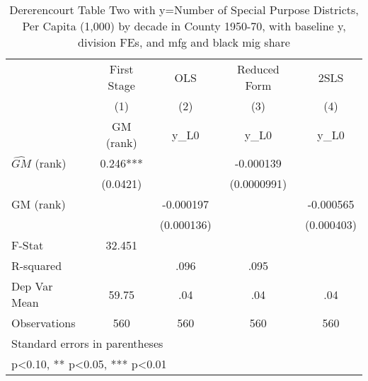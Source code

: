 \begin{table}[htbp]\centering
\def\sym#1{\ifmmode^{#1}\else\(^{#1}\)\fi}
\caption{Dererencourt Table Two with y=Number of Special Purpose Districts, Per Capita (1,000) by decade in County 1950-70, with baseline y, division FEs, and mfg and black mig share}
\begin{tabular}{l*{4}{c}}
\toprule
                    & First Stage   &         OLS   &Reduced Form   &        2SLS   \\
                    &\multicolumn{1}{c}{(1)}&\multicolumn{1}{c}{(2)}&\multicolumn{1}{c}{(3)}&\multicolumn{1}{c}{(4)}\\
                    &\multicolumn{1}{c}{GM  (rank)}&\multicolumn{1}{c}{y\_L0}&\multicolumn{1}{c}{y\_L0}&\multicolumn{1}{c}{y\_L0}\\
\midrule
$\hat{GM}$ (rank)   &       0.246***&               &   -0.000139   &               \\
                    &    (0.0421)   &               & (0.0000991)   &               \\
\addlinespace
GM  (rank)          &               &   -0.000197   &               &   -0.000565   \\
                    &               &  (0.000136)   &               &  (0.000403)   \\
\midrule
F-Stat              &      32.451   &               &               &               \\
R-squared           &               &        .096   &        .095   &               \\
Dep Var Mean        &       59.75   &         .04   &         .04   &         .04   \\
Observations        &         560   &         560   &         560   &         560   \\
\bottomrule
\multicolumn{5}{l}{\footnotesize Standard errors in parentheses}\\
\multicolumn{5}{l}{\footnotesize * p<0.10, ** p<0.05, *** p<0.01}\\
\end{tabular}
\end{table}
